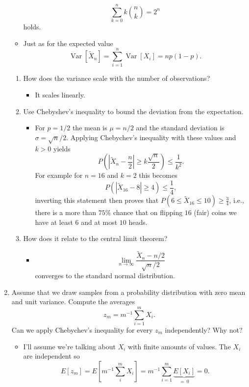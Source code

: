 \documentclass{article}
\begin{document}
\begin{enumerate}
\begin{itemize}
			$$
			\sum_{k = 0}^n k \binom{n}{k} = 2^n
			$$
			holds.
			\item Just as for the expected value
			$$
			\operatorname{Var}[\tilde{X}_n] = \sum_{i = 1}^n \operatorname{Var}[X_i] = np(1 - p).
			$$
		\end{itemize}
		\begin{enumerate}
			\item How does the variance scale with the number of observations?
				\begin{itemize}
					\item It scales linearly.
				\end{itemize}
			\item Use Chebyshev's inequality to bound the deviation from the expectation.
				\begin{itemize}
					\item For $p = 1/2$ the mean is $\mu = n / 2$ and the standard deviation is $\sigma = \sqrt{n} / 2$. Applying Chebychev's inequality with these values and $k > 0$ yields
					$$
					P\left(\left|\tilde{X}_n - \frac{n}{2}\right| \geq k \frac{\sqrt{n}}{2}\right) \leq \frac{1}{k^2}.
					$$
					For example for $n = 16$ and $k = 2$ this becomes
					$$
					P(|\tilde{X}_{16} - 8| \geq 4) \leq \frac{1}{4},
					$$
					inverting this statement then proves that $P(6 \leq \tilde{X}_{16} \leq 10) \geq \frac{3}{4}$, i.e., there is a more than $75\%$ chance that on flipping $16$ (fair) coins we have at least $6$ and at most $10$ heads.
				\end{itemize}
			\item How does it relate to the central limit theorem?
				\begin{itemize}
					\item $$\lim_{n \rightarrow \infty} \frac{\tilde{X}_n - n / 2}{\sqrt{n} / 2}$$ converges to the standard normal distribution.
				\end{itemize}
		\end{enumerate}
	\item Assume that we draw samples from a probability distribution with zero mean and unit variance. Compute the averages
	$$
	z_m = m^{-1} \sum_{i = 1}^m X_i.
	$$
	Can we apply Chebychev's inequality for every $z_m$ independently? Why not?
		\begin{itemize}
			\item I'll assume we're talking about $X_i$ with finite amounts of values. The $X_i$ are independent so
			$$
			E[z_m] = E[m^{-1}\sum_i^m X_i] = m^{-1} \sum_{i = 1}^m \underbrace{E[X_i]}_{=\ 0} = 0.
$$
\end{itemize}
\end{enumerate}
\end{document}
